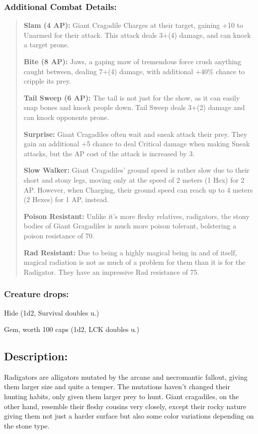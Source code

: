 \documentclass[11pt,a4paper,twocolumn]{book}
\begin{document}
	\subsubsection*{Additional Combat Details:}
	\begin{verse}
		\textbf{Slam (4 AP):} Giant Cragadile Charges at their target, gaining +10 to Unarmed for their attack. This attack deals 3+(4) damage, and can knock a target prone.
		
		\textbf{Bite (8 AP):} Jaws, a gaping maw of tremendous force crush anything caught between, dealing 7+(4) damage, with additional +40\% chance to cripple its prey.
		
		\textbf{Tail Sweep (6 AP):} The tail is not just for the show, as it can easily snap bones and knock people down. Tail Sweep deals 3+(2) damage and can knock opponents prone.
		
		\textbf{Surprise:} Giant Cragadiles often wait and sneak attack their prey. They gain an additional +5 chance to deal Critical damage when making Sneak attacks, but the AP cost of the attack is increased by 3.
		
		\textbf{Slow Walker:} Giant Cragadiles' ground speed is rather slow due to their short and stony legs, moving only at the speed of 2 meters (1 Hex) for 2 AP. However, when Charging, their ground speed can reach up to 4 meters (2 Hexes) for 1 AP, instead.
		
		\textbf{Poison Resistant:} Unlike it's more fleshy relatives, radigators, the stony bodies of Giant Gragadiles is much more poison tolerant, bolstering a poison resistance of 70.
		
		\textbf{Rad Resistant:} Due to being a highly magical being in and of itself, magical radiation is not as much of a problem for them than it is for the Radigator. They have an impressive Rad resistance of 75.
	\end{verse}
	
	\subsubsection*{Creature drops:}
	\begin{compactitem}
		\item Hide (1d2, Survival doubles u.)
		\item Gem, worth 100 caps (1d2, LCK doubles u.)
	\end{compactitem}
	
	\subsection*{Description:}
	Radigators are alligators mutated by the arcane and necromantic fallout, giving them larger size and quite a temper. The mutations haven't changed their hunting habits, only given them larger prey to hunt. Giant cragadiles, on the other hand, resemble their fleshy cousins very closely, except their rocky nature giving them not just a harder surface but also some color variations depending on the stone type.
	
\end{document}
